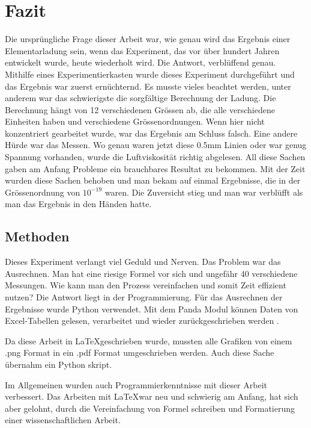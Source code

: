 \chapter{Fazit}\label{cha:fazit}
Die ursprüngliche Frage dieser Arbeit war, wie genau wird das Ergebnis einer Elementarladung sein, wenn das Experiment, das vor über hundert Jahren entwickelt wurde, heute wiederholt wird. Die Antwort, verblüffend genau. Mithilfe eines Experimentierkasten wurde dieses Experiment durchgeführt und das Ergebnis war zuerst ernüchternd. Es musste vieles beachtet werden, unter anderem war das schwierigste die sorgfältige Berechnung der Ladung. Die Berechnung hängt von 12 verschiedenen Grössen ab, die alle verschiedene Einheiten haben und verschiedene Grössenordnungen. Wenn hier nicht konzentriert gearbeitet wurde, war das Ergebnis am Schluss falsch. Eine andere Hürde war das Messen. Wo genau waren jetzt diese 0.5mm Linien oder war genug Spannung vorhanden, wurde die Luftviskosität richtig abgelesen. All diese Sachen gaben am Anfang Probleme ein brauchbares Resultat zu bekommen. Mit der Zeit wurden diese Sachen behoben und man bekam auf einmal Ergebnisse, die in der Grössenordnung von $10^{-19}$ waren. Die Zuversicht stieg und man war verblüfft als man das Ergebnis in den Händen hatte. 

\section{Methoden}\label{sec:methoden}
Dieses Experiment verlangt viel Geduld und Nerven. Das Problem war das Ausrechnen. Man hat eine riesige Formel vor sich und ungefähr 40 verschiedene Messungen. Wie kann man den Prozess vereinfachen und somit Zeit effizient nutzen? Die Antwort liegt in der Programmierung. Für das Ausrechnen der Ergebnisse wurde Python verwendet. Mit dem Panda Modul können Daten von Excel-Tabellen gelesen, verarbeitet und wieder zurückgeschrieben werden \parencite{Inc_2024}. 

Da diese Arbeit in \LaTeX geschrieben wurde, mussten alle Grafiken von einem .png Format in ein .pdf Format umgeschrieben werden. Auch diese Sache übernahm ein Python skript. 

Im Allgemeinen wurden auch Programmierkenntnisse mit dieser Arbeit verbessert. Das Arbeiten mit \LaTeX war neu und schwierig am Anfang, hat sich aber gelohnt, durch die Vereinfachung von Formel schreiben und Formatierung einer wissenschaftlichen Arbeit. 

